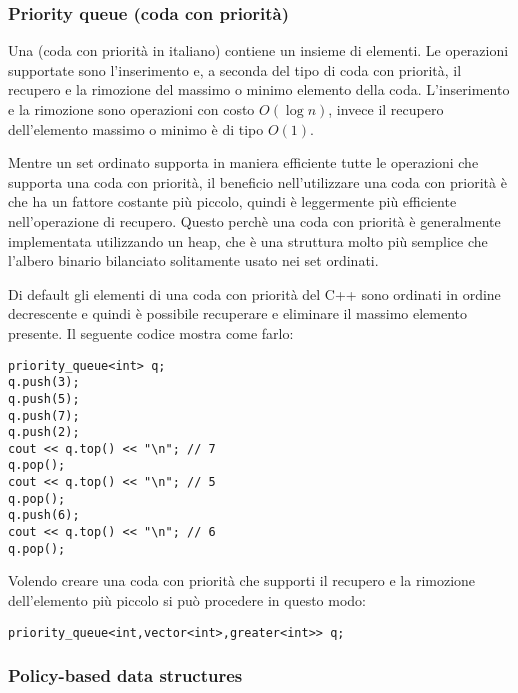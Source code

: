 \subsubsection{Priority queue (coda con priorità)}


Una  (coda con priorità in italiano)
contiene un insieme di elementi.
Le operazioni supportate sono l'inserimento e,
a seconda del tipo di coda con priorità,
il recupero e la rimozione del massimo o minimo elemento 
della coda.
L'inserimento e la rimozione sono operazioni
con costo $O(\log n)$,
invece il recupero dell'elemento massimo o minimo
è di tipo $O(1)$.

Mentre un set ordinato supporta in maniera
efficiente tutte le operazioni che supporta una coda con priorità,
il beneficio nell'utilizzare una coda con priorità è che
ha un fattore costante più piccolo, quindi è leggermente più efficiente 
nell'operazione di recupero. Questo perchè una coda con priorità 
è generalmente implementata utilizzando un heap, che è una 
struttura molto più semplice che l'albero binario bilanciato
solitamente usato nei set ordinati.

\begin{samepage}
Di default gli elementi di una coda con priorità
del C++ sono ordinati in ordine decrescente e quindi è
possibile recuperare e eliminare il massimo
elemento presente.
Il seguente codice mostra come farlo:

\begin{lstlisting}
priority_queue<int> q;
q.push(3);
q.push(5);
q.push(7);
q.push(2);
cout << q.top() << "\n"; // 7
q.pop();
cout << q.top() << "\n"; // 5
q.pop();
q.push(6);
cout << q.top() << "\n"; // 6
q.pop();
\end{lstlisting}
\end{samepage}

Volendo creare una coda con priorità 
che supporti il recupero e la rimozione dell'elemento
più piccolo si può procedere in questo modo:

\begin{lstlisting}
priority_queue<int,vector<int>,greater<int>> q;
\end{lstlisting}

\subsubsection{Policy-based data structures}

